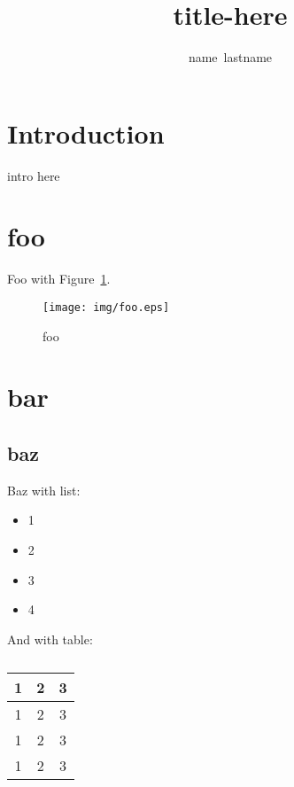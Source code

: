 \documentclass[12pt,journal,a4paper,onecolumn]{IEEEtran}
\begin{document}
\title{title-here}
\author{name~lastname}
\maketitle

%
\section{Introduction}
intro here

%
\section{foo}
\label{sec:foo}
Foo with Figure~\ref{fig:foo}.

\begin{figure}[htb]
    \centering
    \texttt{[image: img/foo.eps]}
    \caption{foo}
    \label{fig:foo}
\end{figure}


%
\section{bar}
\subsection{baz}
\label{sub:baz}

Baz with list:

\begin{itemize}
    \item 1
    \item 2
    \item 3
    \item 4
\end{itemize}

And with table:

\begin{table}[h]
    \normalsize
    \centering
    \begin{tabular}{|c|c|c|}
    \hline
        1 & 2 & 3\\
    \hline
        1 & 2 & 3\\
    \hline
        1 & 2 & 3\\
    \hline
        1 & 2 & 3\\
    \hline
    \end{tabular}
    \caption{}
    \label{tab:}
\end{table}

\subsection{}
\label{sub:}
\end{document}

